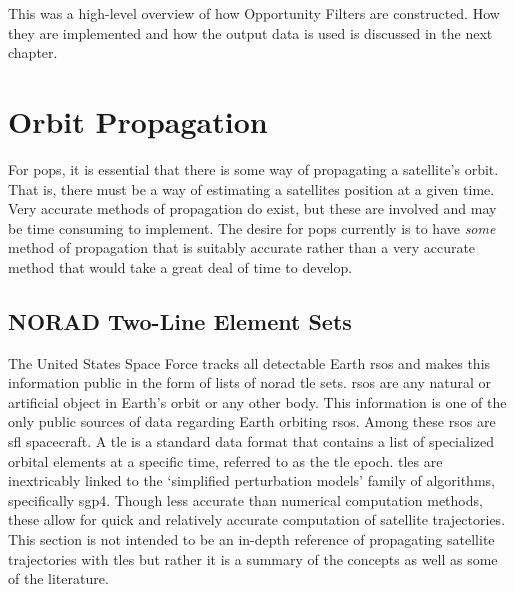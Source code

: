 This was a high-level overview of how Opportunity Filters are constructed. How
they are implemented and how the output data is used is discussed in the next
chapter.


\section{Orbit Propagation}

For \gls{pops}, it is essential that there is some way of propagating a
satellite's orbit. That is, there must be a way of estimating a satellites
position at a given time.  Very accurate methods of propagation do exist, but
these are involved and may be time consuming to implement. The desire for
\gls{pops} currently is to have \textit{some} method of propagation that is
suitably accurate rather than a very accurate method that would take a great
deal of time to develop.

\subsection{NORAD Two-Line Element Sets}

The United States Space Force tracks all detectable Earth \glspl{rso} and makes
this information public in the form of lists of \gls{norad} \gls{tle} sets.
\glspl{rso} are any natural or artificial object in Earth's orbit or any other
body.  This information is one of the only public sources of data regarding
Earth orbiting \glspl{rso}. Among these \glspl{rso} are \gls{sfl} spacecraft. A
\gls{tle} is a standard data format that contains a list of specialized orbital
elements at a specific time, referred to as the \gls{tle} epoch. \glspl{tle}
are inextricably linked to the `simplified perturbation models' family of
algorithms, specifically \gls{sgp4}.  Though less accurate than numerical
computation methods, these allow for quick and relatively accurate computation
of satellite trajectories.  This section is not intended to be an in-depth
reference of propagating satellite trajectories with \glspl{tle} but rather it
is a summary of the concepts as well as some of the literature.

